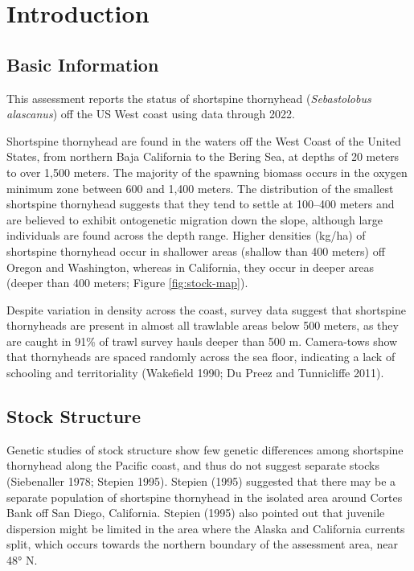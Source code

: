 \documentclass[11pt,
  english,
  letterpaper,
]{article}
\begin{document}
\pagebreak
\setlength{\parskip}{5mm plus1mm minus1mm}
\setcounter{page}{1}
\renewcommand{\thefigure}{\arabic{figure}}
\renewcommand{\thetable}{\arabic{table}}
\setcounter{table}{0}
\setcounter{figure}{0}

\hypertarget{introduction}{%
\section{Introduction}\label{introduction}}

\hypertarget{basic-information}{%
\subsection{Basic Information}\label{basic-information}}

This assessment reports the status of shortspine thornyhead (\emph{Sebastolobus alascanus}) off the US West coast using data through 2022.

Shortspine thornyhead are found in the waters off the West Coast of the United States, from northern Baja California to the Bering Sea, at depths of 20 meters to over 1,500 meters. The majority of the spawning biomass occurs in the oxygen minimum zone between 600 and 1,400 meters. The distribution of the smallest shortspine thornyhead suggests that they tend to settle at 100--400 meters and are believed to exhibit ontogenetic migration down the slope, although large individuals are found across the depth range. Higher densities (kg/ha) of shortspine thornyhead occur in shallower areas (shallow than 400 meters) off Oregon and Washington, whereas in California, they occur in deeper areas (deeper than 400 meters; Figure \ref{fig:stock-map}).

Despite variation in density across the coast, survey data suggest that shortspine thornyheads are present in almost all trawlable areas below 500 meters, as they are caught in 91\% of trawl survey hauls deeper than 500 m. Camera-tows show that thornyheads are spaced randomly across the sea floor, indicating a lack of schooling and territoriality (Wakefield 1990; Du Preez and Tunnicliffe 2011).

\hypertarget{stock-structure}{%
\subsection{Stock Structure}\label{stock-structure}}

Genetic studies of stock structure show few genetic differences among shortspine thornyhead along the Pacific coast, and thus do not suggest separate stocks (Siebenaller 1978; Stepien 1995). Stepien (1995) suggested that there may be a separate population of shortspine thornyhead in the isolated area around Cortes Bank off San Diego, California. Stepien (1995) also pointed out that juvenile dispersion might be limited in the area where the Alaska and California currents split, which occurs towards the northern boundary of the assessment area, near 48° N.
\end{document}

